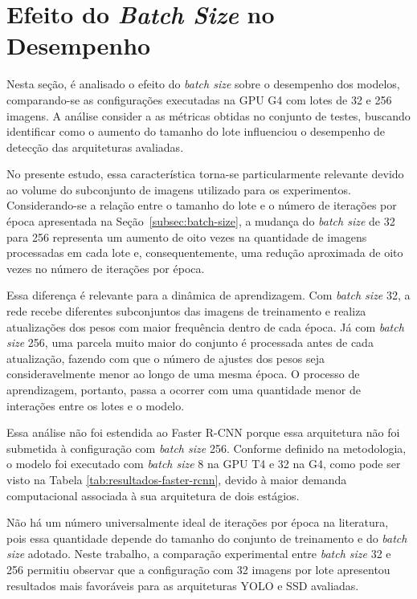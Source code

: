\section[Efeito do Batch Size no Desempenho]{Efeito do \textit{Batch Size} no Desempenho}
\label{sec:batch-size}

Nesta seção, é analisado o efeito do \textit{batch size} sobre o desempenho dos modelos,
comparando-se as configurações executadas na GPU G4 com lotes de 32 e 256 imagens. A análise
consider a as métricas obtidas no conjunto de testes, buscando identificar como o aumento do
tamanho do lote influenciou o desempenho de detecção das arquiteturas avaliadas.

No presente estudo, essa característica torna-se particularmente relevante devido ao volume
do subconjunto de imagens utilizado para os experimentos. Considerando-se
a relação entre o tamanho do lote e o número de iterações por época apresentada na
Seção~\ref{subsec:batch-size}, a mudança do \textit{batch size} de 32 para 256
representa um aumento de oito vezes na quantidade de imagens processadas em cada lote e,
consequentemente, uma redução aproximada de oito vezes no número de iterações por época.

Essa diferença é relevante para a dinâmica de aprendizagem. Com \textit{batch size} 32, a rede
recebe diferentes subconjuntos das imagens de treinamento e realiza atualizações dos pesos com
maior frequência dentro de cada época. Já com \textit{batch size} 256, uma parcela muito maior
do conjunto é processada antes de cada atualização, fazendo com que o número de ajustes dos
pesos seja consideravelmente menor ao longo de uma mesma época. O processo de aprendizagem,
portanto, passa a ocorrer com uma quantidade menor de interações entre os lotes e o modelo.

Essa análise não foi estendida ao Faster R-CNN porque essa arquitetura não foi submetida à
configuração com \textit{batch size} 256. Conforme definido na metodologia, o modelo foi executado
com \textit{batch size} 8 na GPU T4 e 32 na G4, como pode ser visto na Tabela
\ref{tab:resultados-faster-rcnn}, devido à maior demanda computacional associada à sua arquitetura
de dois estágios.

Não há um número universalmente ideal de iterações por época na literatura, pois essa quantidade 
depende do tamanho do conjunto de treinamento e do \textit{batch size} adotado. Neste trabalho, 
a comparação experimental entre \textit{batch size} 32 e 256 permitiu observar que a configuração 
com 32 imagens por lote apresentou resultados mais favoráveis para as arquiteturas YOLO e SSD avaliadas.

